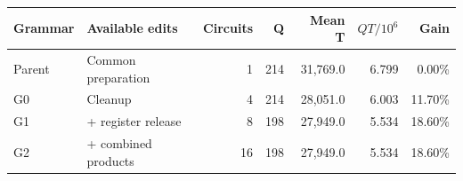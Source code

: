 \begin{tabular}{llrrrrr}
\toprule
Grammar & Available edits & Circuits & Q & Mean T & $QT/10^6$ & Gain \\
\midrule
Parent & Common preparation & 1 & 214 & 31,769.0 & 6.799 & 0.00\% \\
G0 & Cleanup & 4 & 214 & 28,051.0 & 6.003 & 11.70\% \\
G1 & + register release & 8 & 198 & 27,949.0 & 5.534 & 18.60\% \\
G2 & + combined products & 16 & 198 & 27,949.0 & 5.534 & 18.60\% \\
\bottomrule
\end{tabular}
